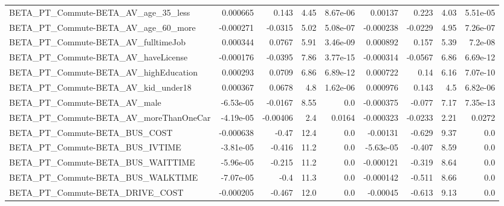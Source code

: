 \begin{tabular}{lrrrrrrrr}
BETA\_PT\_Commute-BETA\_AV\_age\_35\_less                &    0.000665 &        0.143 &      4.45 & 8.67e-06 &    0.00137 &       0.223 &         4.03 &      5.51e-05 \\
BETA\_PT\_Commute-BETA\_AV\_age\_60\_more                &   -0.000271 &      -0.0315 &      5.02 & 5.08e-07 &  -0.000238 &     -0.0229 &         4.95 &      7.26e-07 \\
BETA\_PT\_Commute-BETA\_AV\_fulltimeJob                &    0.000344 &       0.0767 &      5.91 & 3.46e-09 &   0.000892 &       0.157 &         5.39 &       7.2e-08 \\
BETA\_PT\_Commute-BETA\_AV\_haveLicense                &   -0.000176 &      -0.0395 &      7.86 & 3.77e-15 &  -0.000314 &     -0.0567 &         6.86 &      6.69e-12 \\
BETA\_PT\_Commute-BETA\_AV\_highEducation              &    0.000293 &       0.0709 &      6.86 & 6.89e-12 &   0.000722 &        0.14 &         6.16 &      7.07e-10 \\
BETA\_PT\_Commute-BETA\_AV\_kid\_under18                &    0.000367 &       0.0678 &       4.8 & 1.62e-06 &   0.000976 &       0.143 &          4.5 &      6.82e-06 \\
BETA\_PT\_Commute-BETA\_AV\_male                       &   -6.53e-05 &      -0.0167 &      8.55 &      0.0 &  -0.000375 &      -0.077 &         7.17 &      7.35e-13 \\
BETA\_PT\_Commute-BETA\_AV\_moreThanOneCar             &   -4.19e-05 &     -0.00406 &       2.4 &   0.0164 &  -0.000323 &     -0.0233 &         2.21 &        0.0272 \\
BETA\_PT\_Commute-BETA\_BUS\_COST                      &   -0.000638 &        -0.47 &      12.4 &      0.0 &   -0.00131 &      -0.629 &         9.37 &           0.0 \\
BETA\_PT\_Commute-BETA\_BUS\_IVTIME                    &   -3.81e-05 &       -0.416 &      11.2 &      0.0 &  -5.63e-05 &      -0.407 &         8.59 &           0.0 \\
BETA\_PT\_Commute-BETA\_BUS\_WAITTIME                  &   -5.96e-05 &       -0.215 &      11.2 &      0.0 &  -0.000121 &      -0.319 &         8.64 &           0.0 \\
BETA\_PT\_Commute-BETA\_BUS\_WALKTIME                  &   -7.07e-05 &         -0.4 &      11.3 &      0.0 &  -0.000142 &      -0.511 &         8.66 &           0.0 \\
BETA\_PT\_Commute-BETA\_DRIVE\_COST                    &   -0.000205 &       -0.467 &      12.0 &      0.0 &   -0.00045 &      -0.613 &         9.13 &           0.0 \\

\end{tabular}
